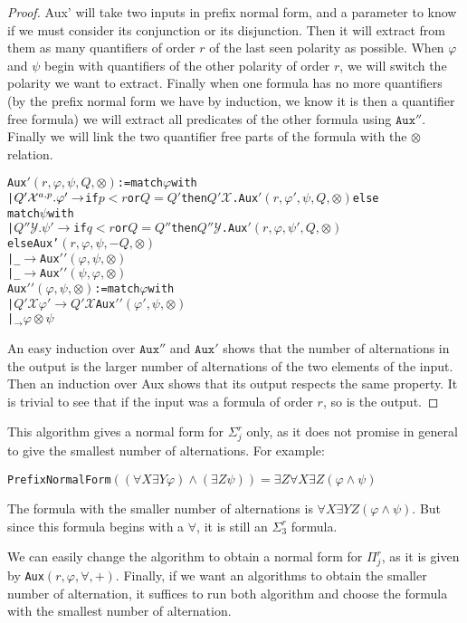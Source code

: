 \documentclass[a4paper,12pt]{article}
\theoremstyle{definition}
\renewcommand{\phi}{\varphi}
\newcommand{\hob}[2]{\ensuremath{\Sigma^{#1}_{#2}}}
\newcommand{\cohob}[2]{\ensuremath{\Pi^{#1}_{#2}}}
\newcommand{\mc}{\mathcal}
\begin{document}
\begin{proof}
Aux' will take two inputs in prefix normal form, and a parameter to
know if we must consider its conjunction or its disjunction. Then it
will extract from them as many quantifiers of order $r$ of the last
seen polarity as possible. When $\phi$ and $\psi$ begin with
quantifiers of the other polarity of order $r$, we will switch the
polarity we want to extract. Finally when one formula has no more
quantifiers (by the prefix normal form we have by induction, we know
it is then a quantifier free formula) we will extract all predicates
of the other formula using $\texttt{Aux}''$.  Finally we
will link the two quantifier free parts of the formula with the
$\otimes$ relation.
\begin{alltt}
Aux\('\)\((r,\phi,\psi,Q,\otimes)\):= match \(\phi\) with 
  |\(Q'\mc{X}\sp{a,p}.\phi'\rightarrow\)if \(p<r\) or \(Q=Q'\) then \(Q'\mc{X}\).Aux\('\)\((r,\phi',\psi,Q,\otimes)\) else
    match \(\psi\) with
      |\(Q''\mc{Y}.\psi'\rightarrow\)if \(q<r\) or \(Q=Q''\) then \(Q''\mc{Y}\).Aux\('\)\((r,\phi,\psi',Q,\otimes)\)
        else Aux'\((r,\phi,\psi,-Q,\otimes)\)
      |\_\(\rightarrow\)Aux\('\)\('\)\((\phi,\psi,\otimes)\)
  |\_\(\rightarrow\)Aux\('\)\('\)\((\psi,\phi,\otimes)\)
Aux\('\)\('\)\((\phi,\psi,\otimes)\):= match \(\phi\) with 
  |\(Q'\mc{X}\phi'\rightarrow Q'\mc{X}\)Aux\('\)\('\)\((\phi',\psi,\otimes)\)
  |\(_\rightarrow \phi\otimes\psi\)
\end{alltt}
An easy induction over $\texttt{Aux}''$ and
$\texttt{Aux}'$ shows that the number of alternations in the
output is the larger number of alternations of the two elements of the
input.  Then an induction over Aux shows that its output respects the
same property. It is trivial to see that if the input was a formula of
order $r$, so is the output.
\end{proof}

This algorithm gives a normal form for $\hob{r}{j}$ only, as it does not
promise in general to give the smallest number of alternations. For
example:

\texttt{PrefixNormalForm}$((\forall X\exists Y\phi)\land(\exists Z
\psi))=\exists Z\forall X\exists Z(\phi\land\psi)$

The formula with the smaller number of alternations is $\forall
X\exists Y Z(\phi\land\psi)$. But since this formula begins with a
$\forall$, it is still an $\hob{r}{3}$ formula.

We can easily change the algorithm to obtain a normal form for
$\cohob{r}{j}$, as it is given by
\texttt{Aux}$(r,\phi,\forall,+)$. Finally, if we want an algorithms to obtain the smaller number of
alternation, it suffices to run both algorithm and choose the formula
with the smallest number of alternation.
\end{document}
